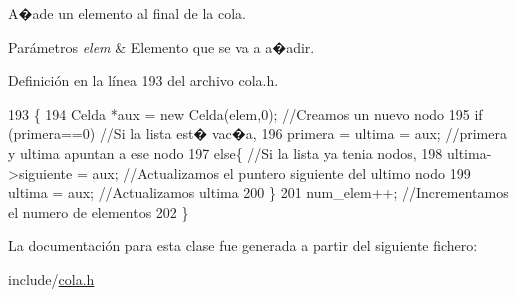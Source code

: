 A�ade un elemento al final de la cola. 


\begin{DoxyParams}{Parámetros}
{\em elem} & Elemento que se va a a�adir. \\
\hline
\end{DoxyParams}


Definición en la línea 193 del archivo cola.\+h.


\begin{DoxyCode}
193                                  \{
194   Celda *aux = \textcolor{keyword}{new} Celda(elem,0);    \textcolor{comment}{//Creamos un nuevo nodo}
195   \textcolor{keywordflow}{if} (primera==0)                    \textcolor{comment}{//Si la lista est� vac�a,}
196     primera = ultima = aux;          \textcolor{comment}{//primera y ultima apuntan a ese nodo}
197   \textcolor{keywordflow}{else}\{                      \textcolor{comment}{//Si la lista ya tenia nodos,}
198     ultima->siguiente = aux; \textcolor{comment}{//Actualizamos el puntero siguiente del ultimo nodo}
199     ultima = aux;            \textcolor{comment}{//Actualizamos ultima}
200   \}
201   num\_elem++;                \textcolor{comment}{//Incrementamos el numero de elementos}
202 \}
\end{DoxyCode}


La documentación para esta clase fue generada a partir del siguiente fichero\+:\begin{DoxyCompactItemize}
\item 
include/\hyperlink{cola_8h}{cola.\+h}\end{DoxyCompactItemize}
